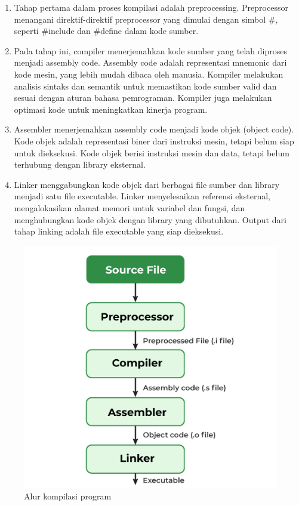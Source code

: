 \begin{enumerate}
	\item {} Tahap pertama dalam proses kompilasi adalah preprocessing. Preprocessor menangani direktif-direktif preprocessor yang dimulai dengan simbol \#, seperti \#include dan \#define dalam kode sumber.
	\item {} Pada tahap ini, compiler menerjemahkan kode sumber yang telah diproses menjadi assembly code. Assembly code adalah representasi mnemonic dari kode mesin, yang lebih mudah dibaca oleh manusia. Kompiler melakukan analisis sintaks dan semantik untuk memastikan kode sumber valid dan sesuai dengan aturan bahasa pemrograman. Kompiler juga melakukan optimasi kode untuk meningkatkan kinerja program.
	\item {} Assembler menerjemahkan assembly code menjadi kode objek (object code). Kode objek adalah representasi biner dari instruksi mesin, tetapi belum siap untuk dieksekusi. Kode objek berisi instruksi mesin dan data, tetapi belum terhubung dengan library eksternal.
	\item {} Linker menggabungkan kode objek dari berbagai file sumber dan library menjadi satu file executable. Linker menyelesaikan referensi eksternal, mengalokasikan alamat memori untuk variabel dan fungsi, dan menghubungkan kode objek dengan library yang dibutuhkan. Output dari tahap linking adalah file executable yang siap dieksekusi.
\end{enumerate}

\begin{figure}
	\centering
	\includegraphics[width=0.35\textheight]
	{assets/pics/program_compile.png}
	\caption{Alur kompilasi program \cite{tut24}}
\end{figure}

